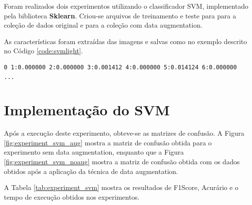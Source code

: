 \documentclass[12pt]{article}
\begin{document}
Foram realizados dois experimentos utilizando o classificador SVM, implementado pela biblioteca \textbf{Sklearn}. Criou-se arquivos de treinamento e teste para para a coleção de dados original e para a coleção com data augmentation.

As características foram extraídas das imagens e salvas como no exemplo descrito no Código \ref{code:svmlight}.

\begin{lstlisting}[caption={Exemplo do Formato de Entrada},captionpos=b,frame=single,label={code:svmlight}]
0 1:0.000000 2:0.000000 3:0.001412 4:0.000000 5:0.014124 6:0.000000 ...
\end{lstlisting}

\section{Implementação do SVM}

Após a execução deste experimento, obteve-se as matrizes de confusão. A Figura \ref{fig:experiment_svm_aug} mostra a matriz de confusão obtida para o experimento sem data augmentation, enquanto que a Figura \ref{fig:experiment_svm_noaug} mostra a matriz de confusão obtida com os dados obtidos após a aplicação da técnica de data augmentation.

A Tabela \ref{tab:experiment_svm} mostra os resultados de F1Score, Acurário e o tempo de execução obtidos nos experimentos.
\end{document}
